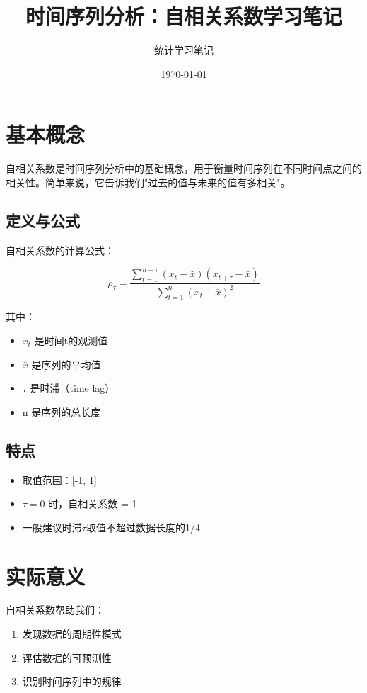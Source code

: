 \documentclass{article}
\title{时间序列分析：自相关系数学习笔记}
\author{统计学习笔记}
\date{\today}
\begin{document}
\maketitle

\section{基本概念}

自相关系数是时间序列分析中的基础概念，用于衡量时间序列在不同时间点之间的相关性。简单来说，它告诉我们"过去的值与未来的值有多相关"。

\subsection{定义与公式}

自相关系数的计算公式：

\begin{equation}
    \rho_\tau = \frac{\sum_{t=1}^{n-\tau}(x_t - \bar{x})(x_{t+\tau} - \bar{x})}{\sum_{t=1}^{n}(x_t - \bar{x})^2}
\end{equation}

其中：
\begin{itemize}
    \item $x_t$ 是时间t的观测值
    \item $\bar{x}$ 是序列的平均值
    \item $\tau$ 是时滞（time lag）
    \item n 是序列的总长度
\end{itemize}

\subsection{特点}
\begin{itemize}
    \item 取值范围：[-1, 1]
    \item $\tau = 0$ 时，自相关系数 = 1
    \item 一般建议时滞$\tau$取值不超过数据长度的1/4
\end{itemize}

\section{实际意义}

自相关系数帮助我们：
\begin{enumerate}
    \item 发现数据的周期性模式
    \item 评估数据的可预测性
    \item 识别时间序列中的规律
\end{enumerate}
\end{document}
